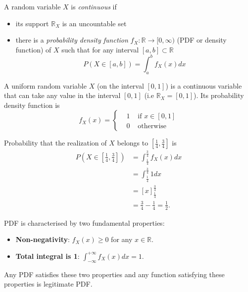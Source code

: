 \begin{definition}
    A random variable $X$ is \emph{continuous} if
    \begin{itemize}
        \item its support $\mathbb{R}_X$ is an uncountable set
        \item there is a \emph{probability density function} $f_X: \mathbb{R} \to [0, \infty)$ (PDF or density function) of $X$ such that for any interval $[a, b] \subset \mathbb{R}$
        \[
            P(X \in [a, b]) = \int_{a}^{b} f_X(x)dx
        \]
    \end{itemize}
\end{definition}

\begin{example}
    A uniform random variable $X$ (on the interval $[0, 1]$) is a continuous variable that can take any value in the interval $[0, 1]$ (i.e $\mathbb{R}_X = [0, 1]$). Its probability density function is
    \[
        f_X(x) = \left\{
                     \begin{aligned}
                         &1 &\text{ if } x \in [0, 1]\\
                         &0 &\text{ otherwise }
                     \end{aligned}
        \right.
    \]

    Probability that the realization of $X$ belongs to $[\frac{1}{4}, \frac{3}{4}]$ is
    \[
        \begin{aligned}
            P(X \in [\frac{1}{4}, \frac{3}{4}]) &= \int_{\frac{1}{4}}^{\frac{3}{4}} f_X(x)dx \\
            &= \int_{\frac{1}{4}}^{\frac{3}{4}} 1 dx \\
            &= \left[ x \right]_{\frac{1}{4}}^{\frac{3}{4}} \\
            &= \frac{3}{4} - \frac{1}{4} = \frac{1}{2}.
        \end{aligned}
    \]
\end{example}

\begin{notenl}
    PDF is characterised by two fundamental properties:
    \begin{itemize}
        \item \textbf{Non-negativity}: $f_X(x) \geq 0$ for any $x \in \mathbb{R}$.
        \item \textbf{Total integral is 1}: $\int_{-\infty}^{+\infty} f_X(x)dx = 1$.
    \end{itemize}

    Any PDF satisfies these two properties and any function satisfying these properties is legitimate PDF.
\end{notenl}

